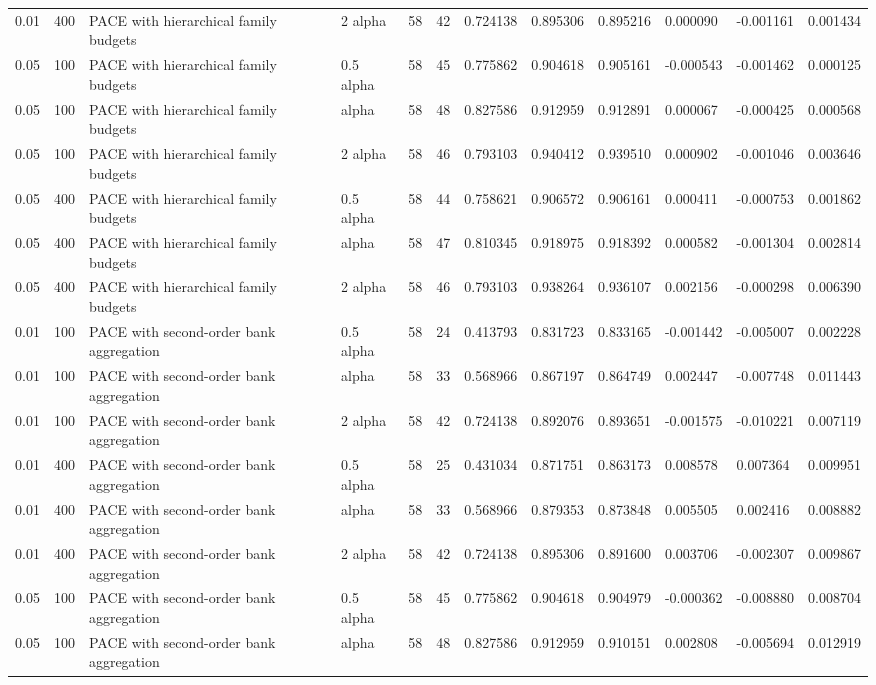 \begin{tabular}{llllllllllll}
0.01 & 400 & PACE with hierarchical family budgets & 2 alpha & 58 & 42 & 0.724138 & 0.895306 & 0.895216 & 0.000090 & -0.001161 & 0.001434 \\
0.05 & 100 & PACE with hierarchical family budgets & 0.5 alpha & 58 & 45 & 0.775862 & 0.904618 & 0.905161 & -0.000543 & -0.001462 & 0.000125 \\
0.05 & 100 & PACE with hierarchical family budgets & alpha & 58 & 48 & 0.827586 & 0.912959 & 0.912891 & 0.000067 & -0.000425 & 0.000568 \\
0.05 & 100 & PACE with hierarchical family budgets & 2 alpha & 58 & 46 & 0.793103 & 0.940412 & 0.939510 & 0.000902 & -0.001046 & 0.003646 \\
0.05 & 400 & PACE with hierarchical family budgets & 0.5 alpha & 58 & 44 & 0.758621 & 0.906572 & 0.906161 & 0.000411 & -0.000753 & 0.001862 \\
0.05 & 400 & PACE with hierarchical family budgets & alpha & 58 & 47 & 0.810345 & 0.918975 & 0.918392 & 0.000582 & -0.001304 & 0.002814 \\
0.05 & 400 & PACE with hierarchical family budgets & 2 alpha & 58 & 46 & 0.793103 & 0.938264 & 0.936107 & 0.002156 & -0.000298 & 0.006390 \\
0.01 & 100 & PACE with second-order bank aggregation & 0.5 alpha & 58 & 24 & 0.413793 & 0.831723 & 0.833165 & -0.001442 & -0.005007 & 0.002228 \\
0.01 & 100 & PACE with second-order bank aggregation & alpha & 58 & 33 & 0.568966 & 0.867197 & 0.864749 & 0.002447 & -0.007748 & 0.011443 \\
0.01 & 100 & PACE with second-order bank aggregation & 2 alpha & 58 & 42 & 0.724138 & 0.892076 & 0.893651 & -0.001575 & -0.010221 & 0.007119 \\
0.01 & 400 & PACE with second-order bank aggregation & 0.5 alpha & 58 & 25 & 0.431034 & 0.871751 & 0.863173 & 0.008578 & 0.007364 & 0.009951 \\
0.01 & 400 & PACE with second-order bank aggregation & alpha & 58 & 33 & 0.568966 & 0.879353 & 0.873848 & 0.005505 & 0.002416 & 0.008882 \\
0.01 & 400 & PACE with second-order bank aggregation & 2 alpha & 58 & 42 & 0.724138 & 0.895306 & 0.891600 & 0.003706 & -0.002307 & 0.009867 \\
0.05 & 100 & PACE with second-order bank aggregation & 0.5 alpha & 58 & 45 & 0.775862 & 0.904618 & 0.904979 & -0.000362 & -0.008880 & 0.008704 \\
0.05 & 100 & PACE with second-order bank aggregation & alpha & 58 & 48 & 0.827586 & 0.912959 & 0.910151 & 0.002808 & -0.005694 & 0.012919 \\

\end{tabular}
